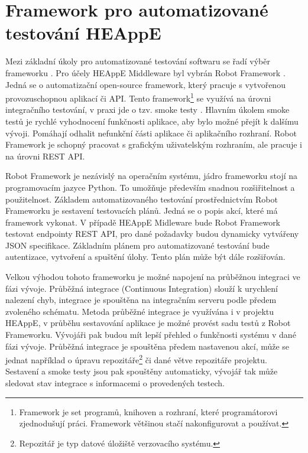 \section{Framework pro automatizované testování HEAppE}
Mezi základní úkoly pro automatizované testování softwaru se řadí výběr frameworku . Pro účely HEAppE Middleware byl vybrán Robot Framework \cite{UDdvJfGpGdOGQs2a}. Jedná se o automatizační open-source framework, který pracuje s vytvořenou provozuschopnou aplikací či API. Tento framework\footnote{Framework je set programů, knihoven a rozhraní, které programátorovi zjednodušují práci. Framework většinou stačí nakonfigurovat a používat.} se využívá na úrovni integračního testování, v praxi jde o tzv. smoke testy \cite{K35ZsSqAfq3Ec1XJ}. Hlavním úkolem smoke testů je rychlé vyhodnocení funkčnosti aplikace, aby bylo možné přejít k dalšímu vývoji. Pomáhají odhalit nefunkční části aplikace či aplikačního rozhraní. Robot Framework je schopný pracovat s grafickým uživatelským rozhraním, ale pracuje i na úrovni REST API.

Robot Framework je nezávislý na operačním systému, jádro frameworku stojí na programovacím jazyce Python. To umožňuje především snadnou rozšiřitelnost a použitelnost. Základem automatizovaného testování prostřednictvím Robot Frameworku je sestavení testovacích plánů. Jedná se o popis akcí, které má framework vykonat. V případě HEAppE Midleware bude Robot Framework testovat endpointy REST API, pro dané požadavky budou dynamicky vytvářeny JSON specifikace. Základním plánem pro automatizované testování bude autentizace, vytvoření a spuštění úlohy. Tento plán může být dále rozšiřován.

Velkou výhodou tohoto frameworku je možné napojení na průběžnou integraci ve fázi vývoje. Průběžná integrace (Continuous Integration) slouží k urychlení nalezení chyb, integrace je spouštěna na integračním serveru podle předem zvoleného schématu. Metoda průběžné integrace je využívána i v projektu HEAppE, v průběhu sestavování aplikace je možné provést sadu testů z Robot Frameworku. Vývojáři pak budou mít lepší přehled o funkčnosti systému v dané fázi vývoje. Průběžná integrace je spouštěna předem nastavenou akcí, může se jednat například o úpravu repozitáře\footnote{Repozitář je typ datové úložiště verzovacího systému.}  či dané větve repozitáře projektu. Sestavení a smoke testy jsou pak spouštěny automaticky, vývojář tak může sledovat stav integrace s informacemi o provedených testech. 

